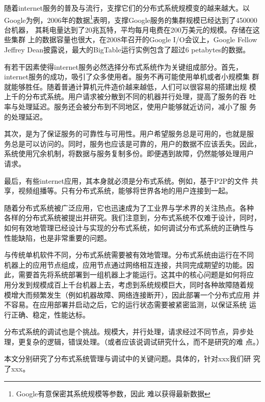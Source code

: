 随着internet服务的普及与流行，支撑它们的分布式系统规模变的越来越大。以
Google为例，2006年的数据\footnote{Google有意保密其系统规模等参数，因此
难以获得最新数据}表明，支撑Google服务的集群规模已经达到了450000台机器，
其耗电量达到了20兆瓦特，平均每月电费在200万美元的规模。存储在这些集群
上的数据容量也很大，在2008年召开的Google I/O会议上，Google Fellow
Jeffrey Dean披露说，最大的BigTable运行实例包含了超过6 petabytes的数据。


有若干因素使得internet服务必然选择分布式系统作为关键组成部分。首先，
internet服务的成功，吸引了众多使用者。服务不再可能使用单机或者小规模集
群就能够胜任。随着普通计算机元件造价越来越低，人们可以很容易的搭建出规
模上千的分布式系统。用户请求被分散到不同的机器并行处理，提高了服务的吞
吐率与处理延迟。服务还会被分布到不同地区，使用户能够就近访问，减小了服
务的处理延迟。

其次，是为了保证服务的可靠性与可用性。用户希望服务总是可用的，也就是服
务总是可以访问的。同时，服务也应该是可靠的，用户的数据不应该丢失。因此，
系统使用冗余机制，将数据与服务复制多份。即便遇到故障，仍然能够处理用户
请求。

最后，有些internet应用，其本身就必须是分布式系统。例如，基于P2P的文件
共享，视频组播等。只有分布式系统，能够将世界各地的用户连接到一起。


随着分布式系统被广泛应用，它也迅速成为了工业界与学术界的关注热点。各种
各样的分布式系统被提出并研究。我们注意到，分布式系统不仅难于设计，同时，
如何有效地管理已经设计与实现的分布式系统，如何调试分布式系统的正确性与
性能缺陷，也是非常重要的问题。

与传统单机软件不同，分布式系统需要被有效地管理。分布式系统由运行在不同
机器上的应用节点组成，应用节点通过网络相互连接，共同完成期望的功能。因
此，需要首先将系统部署到一组机器上才能运行。这其中的核心问题是如何将应
用分发到规模成百上千台机器上去，考虑到系统规模巨大，同时各种故障随着规
模增大而频繁发生（例如机器故障、网络连接断开），因此部署一个分布式应用
并不容易。在应用部署并启动之后，它的运行状态需要被紧密监测，以保证系统
运行正确、稳定，性能达标。

分布式系统的调试也是个挑战。规模大，并行处理，请求经过不同节点，异步处
理，更复杂的逻辑，错误处理。（或者应该说调试研究什么，而不是研究的难
点。）

本文分别研究了分布式系统管理与调试中的关键问题。具体的，针对xxx我们研
究了xxx。


